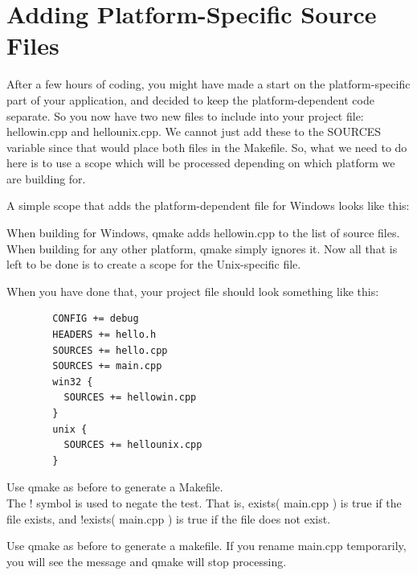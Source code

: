 \section{Adding Platform-Specific Source Files}
After a few hours of coding, you might have made a start on the platform-specific part of your application, and decided to keep the platform-dependent code separate. So you now have two new files to include into your project file: hellowin.cpp and hellounix.cpp. We cannot just add these to the
SOURCES variable since that would place both files in the Makefile. So, what we need to do here is to use a scope which will be processed depending on which platform we are building for.
\par
A simple scope that adds the platform-dependent file for Windows looks like this:
\begin{center}
  {}
\end{center}
When building for Windows, qmake adds hellowin.cpp to the list of source files. When building for any other platform, qmake simply ignores it. Now all that is left to be done is to create a scope for the Unix-specific file.
\par
When you have done that, your project file should look something like this:
\begin{center}
  {\color{seagreen}
    {
      \begin{lstlisting}
        CONFIG += debug
        HEADERS += hello.h
        SOURCES += hello.cpp
        SOURCES += main.cpp
        win32 {
          SOURCES += hellowin.cpp
        }
        unix {
          SOURCES += hellounix.cpp
        }
      \end{lstlisting}
    }}
\end{center}
Use qmake as before to generate a Makefile.\\
The ! symbol is used to negate the test. That is, exists( main.cpp ) is true if the file exists, and !exists( main.cpp ) is true if the file does not exist.
\begin{center}
  {}
\end{center}
Use qmake as before to generate a makefile. If you rename main.cpp temporarily, you will see the message and qmake will stop processing.

